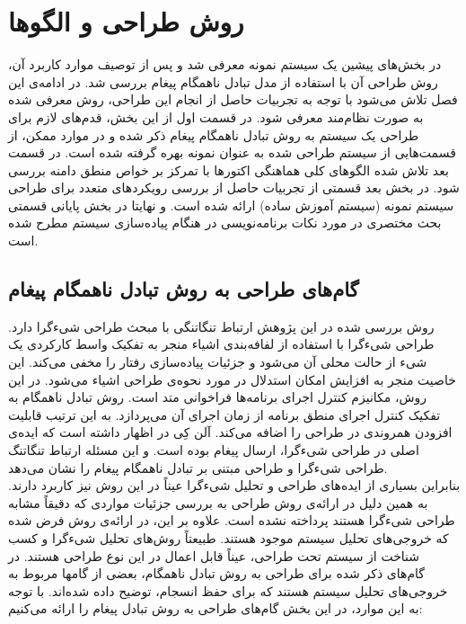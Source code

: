 \chapter{روش طراحی و الگوها}
\label{chapter:RelatedWork}
در بخش‌های پیشین  یک سیستم نمونه معرفی شد و پس از توصیف موارد کاربرد آن، روش طراحی آن با استفاده از مدل تبادل ناهمگام پیغام بررسی شد. در ادامه‌ی این فصل تلاش می‌شود با توجه به تجربیات حاصل از انجام این طراحی، روش معرفی شده به صورت نظام‌مند معرفی شود. در قسمت اول از این بخش، قدم‌های لازم برای طراحی یک سیستم به روش تبادل ناهمگام پیغام ذکر شده و در موارد ممکن، از قسمت‌هایی از سیستم طراحی شده به عنوان نمونه بهره گرفته شده است. در قسمت بعد تلاش شده الگوهای کلی هماهنگی اکتورها با تمرکز بر خواص منطق دامنه بررسی شود. در بخش بعد قسمتی از تجربیات حاصل از بررسی رویکردهای متعدد برای طراحی سیستم نمونه (سیستم آموزش ساده) ارائه شده است. و نهایتا در بخش پایانی قسمتی بحث مختصری در مورد نکات برنامه‌نویسی در هنگام پیاده‌سازی سیستم مطرح شده است.



\section{گام‌های طراحی به روش تبادل ناهمگام پیغام }
\label{section:design_steps}
روش بررسی شده در این پژوهش ارتباط تنگاتنگی با مبحث طراحی شیءگرا دارد. طراحی شیءگرا با استفاده از لفافه‌بندی اشیاء منجر به تفکیک واسط کارکردی یک شیء از حالت محلی آن می‌شود و جزئیات پیاده‌سازی رفتار را مخفی ‌می‌کند. این خاصیت منجر به افزایش امکان استدلال در مورد نحوه‌ی طراحی اشیاء می‌شود. در این روش، مکانیزم کنترل اجرای برنامه‌ها فراخوانی متد است. روش تبادل ناهمگام به تفکیک کنترل اجرای منطق برنامه از زمان اجرای آن می‌پردازد. به این ترتیب قابلیت افزودن همروندی در طراحی را اضافه می‌کند. آلن کِی در \cite{Kay_messaging} اظهار داشته است که ایده‌ی اصلی در طراحی شیءگرا، ارسال پیغام بوده است. و این مسئله ارتباط تنگاتنگ طراحی شیءگرا و طراحی مبتنی بر تبادل ناهمگام پیغام را نشان می‌دهد.\\
بنابراین بسیاری از ایده‌های طراحی و تحلیل شیءگرا عیناً در این روش نیز کاربرد دارند. به همین دلیل در ارائه‌ی روش طراحی به بررسی جزئیات مواردی که دقیقاً مشابه طراحی شیءگرا هستند پرداخته نشده است. علاوه بر این، در ارائه‌ی روش فرض شده که خروجی‌های تحلیل سیستم موجود هستند. طبیعتاً روش‌های تحلیل شیءگرا و کسب شناخت از سیستم تحت طراحی، عیناً قابل اعمال در این نوع طراحی هستند. در گام‌های ذکر شده برای طراحی به روش تبادل ناهمگام، بعضی از گامها مربوط به خروجی‌های تحلیل سیستم هستند که برای حفظ انسجام، توضیح داده شده‌اند. با توجه به این موارد، در این بخش گام‌های طراحی به روش تبادل پیغام را ارائه می‌کنیم:

